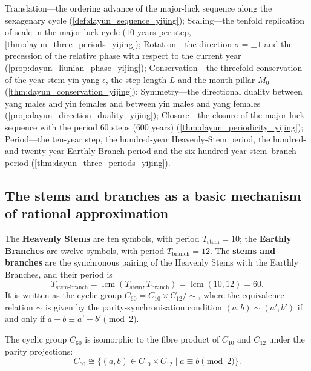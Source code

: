 \begin{remark}\label{rem:dayun_seven_themes}
Translation---the ordering advance of the major-luck sequence along the sexagenary cycle (\cref{def:dayun_sequence_yijing});
Scaling---the tenfold replication of scale in the major-luck cycle ($10$ years per step, \cref{thm:dayun_three_periods_yijing});
Rotation---the direction $\sigma=\pm 1$ and the precession of the relative phase with respect to the current year (\cref{prop:dayun_liunian_phase_yijing});
Conservation---the threefold conservation of the year-stem yin-yang $\epsilon$, the step length $L$ and the month pillar $M_0$ (\cref{thm:dayun_conservation_yijing});
Symmetry---the directional duality between yang males and yin females and between yin males and yang females (\cref{prop:dayun_direction_duality_yijing});
Closure---the closure of the major-luck sequence with the period $60$ steps ($600$ years) (\cref{thm:dayun_periodicity_yijing});
Period---the ten-year step, the hundred-year Heavenly-Stem period, the hundred-and-twenty-year Earthly-Branch period and the six-hundred-year stem--branch period (\cref{thm:dayun_three_periods_yijing}).
\end{remark}

\subsection{The stems and branches as a basic mechanism of rational approximation}

\begin{definition}\label{def:stem_branch_period_yijing}
The \textbf{Heavenly Stems} are ten symbols, with period $T_{\text{stem}}=10$;
the \textbf{Earthly Branches} are twelve symbols, with period $T_{\text{branch}}=12$.
The \textbf{stems and branches} are the synchronous pairing of the Heavenly Stems with the Earthly Branches, and their period is
\[
T_{\text{stem-branch}}=\operatorname{lcm}(T_{\text{stem}},T_{\text{branch}})=\operatorname{lcm}(10,12)=60.
\]
It is written as the cyclic group $C_{60}=C_{10}\times C_{12}/\sim$, where the equivalence relation $\sim$ is given by the parity-synchronisation condition $(a,b)\sim(a',b')$ if and only if $a-b\equiv a'-b'\pmod 2$.
\end{definition}

\begin{proposition}\label{prop:ganzhi_fibre_product_yijing}
The cyclic group $C_{60}$ is isomorphic to the fibre product of $C_{10}$ and $C_{12}$ under the parity projections:
\[
C_{60}\cong\{(a,b)\in C_{10}\times C_{12}\mid a\equiv b\pmod 2\}.
\]
\end{proposition}

